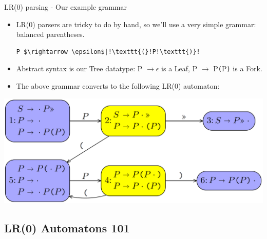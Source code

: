 \documentclass[10pt]{beamer}
\begin{document}
\begin{frame}[fragile]{LR(0) parsing - Our example grammar}

\begin{itemize}
\item LR(0) parsers are tricky to do by hand, so we'll use a very simple grammar: balanced parentheses.

\begin{lstlisting}[mathescape=true, escapechar=!]
P $\rightarrow \epsilon$|!\texttt{(}!P!\texttt{)}!
\end{lstlisting}

\item Abstract syntax is our Tree datatype: P $\rightarrow \epsilon$ is a Leaf, P $\rightarrow$ P\texttt{(}P\texttt{)} is a Fork.

\item The above grammar converts to the following LR(0) automaton:

\end{itemize}

\begin{center}
\includegraphics[scale=0.18]{lr0-automaton.png}
\end{center}

\end{frame}

\subsection{LR(0) Automatons 101}
\end{document}
